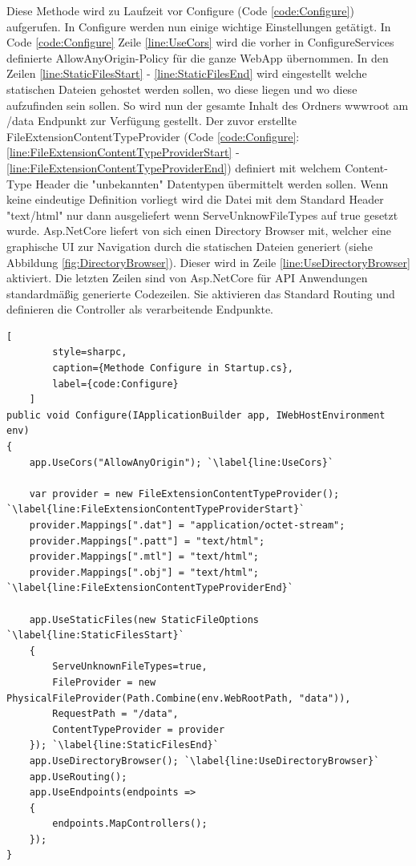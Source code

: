 Diese Methode wird zu Laufzeit vor Configure
(Code \ref{code:Configure}) aufgerufen. In Configure werden nun
einige wichtige Einstellungen getätigt. In Code \ref{code:Configure}
Zeile \ref{line:UseCors} wird die vorher in ConfigureServices definierte
\grqq AllowAnyOrigin\grqq -Policy für die ganze WebApp übernommen.
In den Zeilen \ref{line:StaticFilesStart} - \ref{line:StaticFilesEnd}
wird eingestellt welche statischen Dateien gehostet werden sollen,
wo diese liegen und wo diese aufzufinden sein sollen. So wird nun
der gesamte Inhalt des Ordners wwwroot am /data Endpunkt zur
Verfügung gestellt. Der zuvor erstellte FileExtensionContentTypeProvider
(Code \ref{code:Configure}:
\ref{line:FileExtensionContentTypeProviderStart} -
\ref{line:FileExtensionContentTypeProviderEnd})
definiert mit welchem Content-Type Header die "unbekannten"
Datentypen übermittelt werden sollen. Wenn keine eindeutige
Definition vorliegt wird die Datei mit dem Standard Header
"text/html" nur dann ausgeliefert wenn ServeUnknowFileTypes auf
true gesetzt wurde.
Asp.NetCore liefert von sich einen Directory Browser mit,
welcher eine graphische UI zur Navigation durch die statischen
Dateien generiert (siehe Abbildung \ref{fig:DirectoryBrowser}).
Dieser wird in Zeile \ref{line:UseDirectoryBrowser} aktiviert.
Die letzten Zeilen sind von Asp.NetCore für API Anwendungen
standardmäßig generierte Codezeilen. Sie aktivieren das Standard
Routing und definieren die Controller als verarbeitende Endpunkte.

\begin{codeblock}
	\begin{lstlisting}[
		style=sharpc,
		caption={Methode Configure in Startup.cs},
		label={code:Configure}
	]
public void Configure(IApplicationBuilder app, IWebHostEnvironment env)
{
	app.UseCors("AllowAnyOrigin"); `\label{line:UseCors}`

	var provider = new FileExtensionContentTypeProvider(); `\label{line:FileExtensionContentTypeProviderStart}`
	provider.Mappings[".dat"] = "application/octet-stream";
	provider.Mappings[".patt"] = "text/html";
	provider.Mappings[".mtl"] = "text/html";
	provider.Mappings[".obj"] = "text/html"; `\label{line:FileExtensionContentTypeProviderEnd}`

	app.UseStaticFiles(new StaticFileOptions `\label{line:StaticFilesStart}`
	{
		ServeUnknownFileTypes=true,
		FileProvider = new PhysicalFileProvider(Path.Combine(env.WebRootPath, "data")),
		RequestPath = "/data",
		ContentTypeProvider = provider
	}); `\label{line:StaticFilesEnd}`
	app.UseDirectoryBrowser(); `\label{line:UseDirectoryBrowser}`
	app.UseRouting();
	app.UseEndpoints(endpoints =>
	{
		endpoints.MapControllers();
	});
}
	\end{lstlisting}
\end{codeblock}

